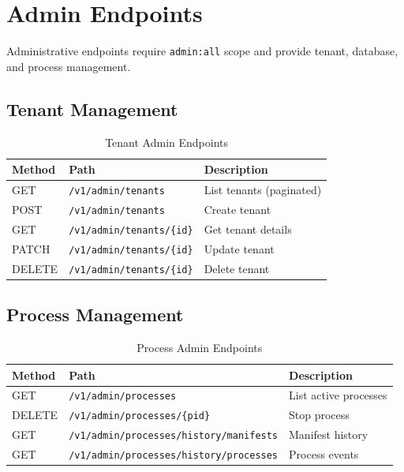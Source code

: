 \documentclass[a4paper,twoside]{sapthesis}
\begin{document}
\section{Admin Endpoints}
\label{app:api:admin}

Administrative endpoints require \texttt{admin:all} scope and provide tenant, database, and process management.

\subsection{Tenant Management}

\begin{table}[ht]
\centering
\caption{Tenant Admin Endpoints}
\label{tab:tenant-admin-endpoints}
\small
\begin{tabularx}{\textwidth}{llX}
    \hline
    \textbf{Method} & \textbf{Path} & \textbf{Description} \\
    \hline
    GET & \texttt{/v1/admin/tenants} & List tenants (paginated) \\
    POST & \texttt{/v1/admin/tenants} & Create tenant \\
    GET & \texttt{/v1/admin/tenants/\{id\}} & Get tenant details \\
    PATCH & \texttt{/v1/admin/tenants/\{id\}} & Update tenant \\
    DELETE & \texttt{/v1/admin/tenants/\{id\}} & Delete tenant \\
    \hline
\end{tabularx}
\end{table}

\subsection{Process Management}

\begin{table}[ht]
\centering
\caption{Process Admin Endpoints}
\label{tab:process-admin-endpoints}
\small
\begin{tabularx}{\textwidth}{llX}
    \hline
    \textbf{Method} & \textbf{Path} & \textbf{Description} \\
    \hline
    GET & \texttt{/v1/admin/processes} & List active processes \\
    DELETE & \texttt{/v1/admin/processes/\{pid\}} & Stop process \\
    GET & \texttt{/v1/admin/processes/history/manifests} & Manifest history \\
    GET & \texttt{/v1/admin/processes/history/processes} & Process events \\
    \hline
\end{tabularx}
\end{table}
\end{document}
